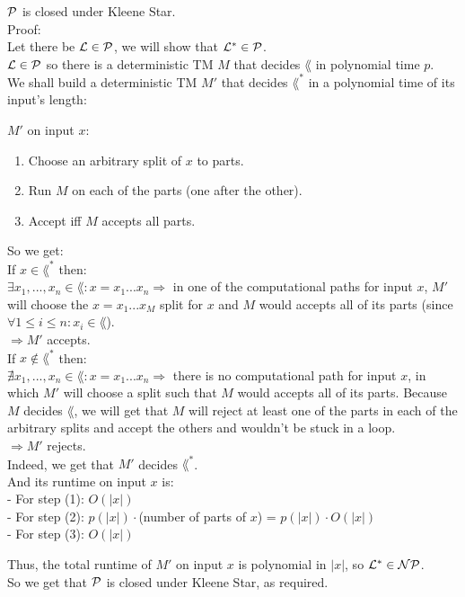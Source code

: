 $\mathcal{P}$ is closed under Kleene Star. \\

Proof: \\

Let there be $\mathcal{L} \in \mathcal{P}$, we will show that $\mathcal{L}^* \in \mathcal{P}$. \\
$\mathcal{L} \in \mathcal{P}$ so there is a deterministic TM $M$ that decides $\lang$ in polynomial time $p$. \\
We shall build a deterministic TM $M'$ that decides $\lang^*$ in a polynomial time of its input's length:

$M'$ on input $x$:

{
\color{red}


\begin{enumerate}[1., itemsep=5pt]

    \item Choose an arbitrary split of $x$ to parts.

    \item Run $M$ on each of the parts (one after the other).

    \item Accept iff $M$ accepts all parts.

\end{enumerate}

So we get: \\
If $x \in \lang^*$ then: \\
$\exists x_1,...,x_n \in \lang: x=x_1...x_n \Rightarrow $ in one of the computational
paths for input $x$, $M'$ will choose the $x=x_1...x_M$ split for $x$ and $M$ would accepts all of its parts
(since $\forall 1 \leq i \leq n: x_i \in \lang$). \\
$\Rightarrow M'$ accepts. \\

If $x \notin \lang^*$ then: \\
$\nexists x_1,...,x_n \in \lang: x=x_1...x_n \Rightarrow $ there is no computational
path for input $x$, in which $M'$ will choose a split such that $M$ would accepts all of its parts.
Because $M$ decides $\lang$, we will get that $M$ will reject at least one of the parts in
each of the arbitrary splits and accept the others and wouldn't be stuck in a loop. \\
$\Rightarrow M'$ rejects. \\

Indeed, we get that $M'$ decides $\lang^*$. \\
And its runtime on input $x$ is: \\
- For step (1): $O(|x|)$ \\
- For step (2): $p(|x|) \cdot$(number of parts of $x$) = $p(|x|) \cdot O(|x|)$ \\
- For step (3): $O(|x|)$

}

Thus, the total runtime of $M'$ on input $x$ is polynomial in $|x|$, so $\mathcal{L}^* \in \mathcal{N}\mathcal{P}$. \\
So we get that $\mathcal{P}$ is closed under Kleene Star, as required. \\

